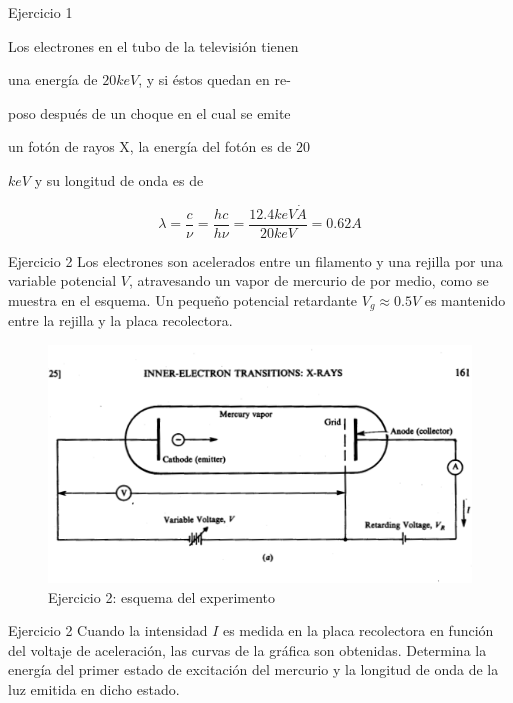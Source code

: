 \documentclass{beamer}
\begin{document}
\begin{darkframes}
\begin{frame}{Ejercicio 1}
\bigskip
{}


Los electrones en el tubo de la televisi\'on tienen 

una energ\'ia de $20 keV$, y si \'estos quedan en re-

poso despu\'es de un choque en el cual se emite 

un fot\'on de rayos X, la energía del fot\'on es de $20$

$keV$ y su longitud de onda es de

\begin{equation*}

    \lambda = \frac{c}{\nu} =\frac{hc}{h\nu} = \frac{12.4 keV \dot A}{20 keV} = 0.62 A
    
\end{equation*}

    
    \end{frame}


    \begin{frame}{Ejercicio 2}
        Los electrones son acelerados entre un filamento y una rejilla por una variable potencial $V$, atravesando un vapor de mercurio de por medio, como se muestra en el esquema. Un peque\~no potencial retardante $V_g \approx 0.5 V$ es mantenido entre la rejilla y la placa recolectora. 
        
        \begin{figure}
            \centering
            \includegraphics[width = 0.65 \linewidth]{resources/30f.png}
            \caption{Ejercicio 2: esquema del experimento}
            \label{fig:my_label}
        \end{figure}
        
    \end{frame}
    
    \begin{frame}{Ejercicio 2}    
        Cuando la intensidad $I$ es medida en la placa recolectora en funci\'on del voltaje de aceleraci\'on, las curvas de la gr\'afica son obtenidas. Determina la energ\'ia del primer estado de excitaci\'on del mercurio y la longitud de onda de la luz emitida en dicho estado.
    

\end{frame}
\end{darkframes}
\end{document}
